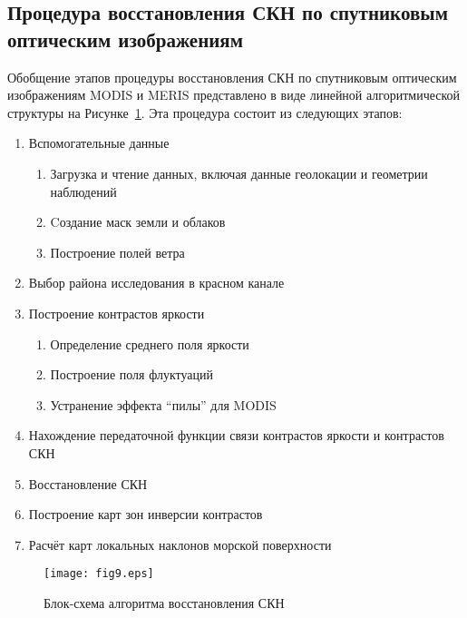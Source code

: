 \subsection{Процедура восстановления СКН по спутниковым оптическим изображениям}

Обобщение этапов процедуры восстановления СКН по спутниковым оптическим изображениям MODIS и MERIS представлено в виде линейной алгоритмической структуры на Рисунке~\ref{fig:9}. Эта процедура состоит из следующих этапов:



\begin{enumerate}
\item Вспомогательные данные
	\begin{enumerate}
		\item Загрузка и чтение данных, включая данные геолокации и геометрии наблюдений
		\item Cоздание маск земли и облаков
		\item Построение полей ветра
	\end{enumerate}	 
\item Выбор района исследования в красном канале
\item Построение контрастов яркости
	\begin{enumerate}
		\item Определение среднего поля яркости
		\item Построение поля флуктуаций
		\item Устранение эффекта ``пилы'' для MODIS
	\end{enumerate}	 
\item Нахождение передаточной функции связи контрастов яркости и контрастов СКН
\item Восстановление СКН
\item Построение карт зон инверсии контрастов
\item Расчёт карт локальных наклонов морской поверхности
\end{enumerate}



\begin{figure}[H]
    \texttt{[image: fig9.eps]}
    \caption{Блок-схема алгоритма восстановления СКН}
    \label{fig:9}
\end{figure}



